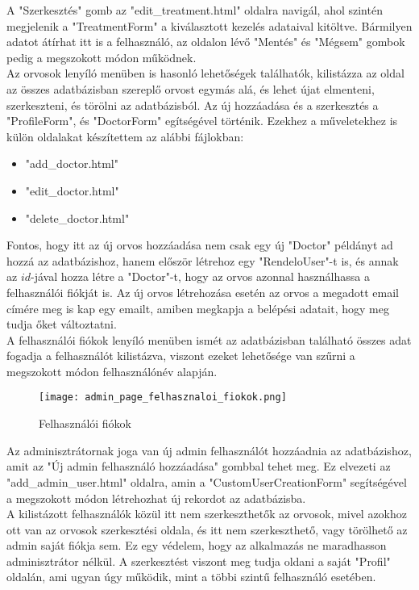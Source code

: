 A "Szerkesztés" gomb az "edit\_treatment.html" oldalra navigál, ahol szintén megjelenik a "TreatmentForm" a kiválasztott kezelés adataival kitöltve. Bármilyen adatot átírhat itt is a felhasználó, az oldalon lévő "Mentés" és "Mégsem" gombok pedig a megszokott módon működnek.\\

Az orvosok lenyíló menüben is hasonló lehetőségek találhatók, kilistázza az oldal az összes adatbázisban szereplő orvost egymás alá, és lehet újat elmenteni, szerkeszteni, és törölni az adatbázisból. Az új hozzáadása és a szerkesztés a "ProfileForm", és "DoctorForm" egítségével történik. Ezekhez a műveletekhez is külön oldalakat készítettem az alábbi fájlokban:

\begin{itemize}
	\item "add\_doctor.html"
	\item "edit\_doctor.html"
	\item "delete\_doctor.html"
\end{itemize}

Fontos, hogy itt az új orvos hozzáadása nem csak egy új "Doctor" példányt ad hozzá az adatbázishoz, hanem először létrehoz egy "RendeloUser"-t is, és annak az $id$-jával hozza létre a "Doctor"-t, hogy az orvos azonnal használhassa a felhasználói fiókját is. Az új orvos létrehozása esetén az orvos a megadott email címére meg is kap egy emailt, amiben megkapja a belépési adatait, hogy meg tudja őket változtatni.\\

A felhasználói fiókok lenyíló menüben ismét az adatbázisban található összes adat fogadja a felhasználót kilistázva, viszont ezeket lehetősége van szűrni a megszokott módon felhasználónév alapján.

\begin{figure}[H]
	\caption{Felhasználói fiókok}
	\label{fig:felhasznaloifiokok}
	\centering
	\texttt{[image: admin\_page\_felhasznaloi\_fiokok.png]}
\end{figure}

Az adminisztrátornak joga van új admin felhasználót hozzáadnia az adatbázishoz, amit az "Új admin felhasználó hozzáadása" gombbal tehet meg. Ez elvezeti az "add\_admin\_user.html" oldalra, amin a "CustomUserCreationForm" segítségével a megszokott módon létrehozhat új rekordot az adatbázisba.\\

A kilistázott felhasználók közül itt nem szerkeszthetők az orvosok, mivel azokhoz ott van az orvosok szerkesztési oldala, és itt nem szerkeszthető, vagy törölhető az admin saját fiókja sem. Ez egy védelem, hogy az alkalmazás ne maradhasson adminisztrátor nélkül. A szerkesztést viszont meg tudja oldani a saját "Profil" oldalán, ami ugyan úgy működik, mint a többi szintű felhasználó esetében.

